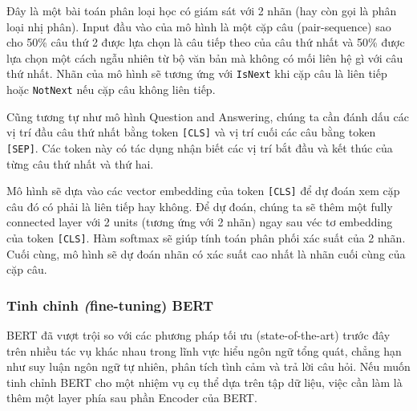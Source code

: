 \begin{enumerate}
    Đây là một bài toán phân loại học có giám sát với 2 nhãn (hay còn gọi là phân loại nhị phân). Input đầu vào của mô hình là một cặp câu (pair-sequence) sao cho 50\% câu thứ 2 được lựa chọn là câu tiếp theo của câu thứ nhất và 50\% được lựa chọn một cách ngẫu nhiên từ bộ văn bản mà không có mối liên hệ gì với câu thứ nhất. Nhãn của mô hình sẽ tương ứng với {\tt {\small IsNext}} khi cặp câu là liên tiếp hoặc {\tt {\small NotNext}} nếu cặp câu không liên tiếp.

    Cũng tương tự như mô hình Question and Answering, chúng ta cần đánh dấu các vị trí đầu câu thứ nhất bằng token {\tt [CLS]} và vị trí cuối các câu bằng token {\tt [SEP]}. Các token này có tác dụng nhận biết các vị trí bắt đầu và kết thúc của từng câu thứ nhất và thứ hai.

    Mô hình sẽ dựa vào các vector embedding của token {\tt [CLS]} để dự đoán xem cặp câu đó có phải là liên tiếp hay không. Để dự đoán, chúng ta sẽ thêm một fully connected layer với 2 units (tương ứng với 2 nhãn) ngay sau véc tơ embedding của token {\tt [CLS]}. Hàm softmax sẽ giúp tính toán phân phối xác suất của 2 nhãn. Cuối cùng, mô hình sẽ dự đoán nhãn có xác suất cao nhất là nhãn cuối cùng của cặp câu.
\end{enumerate}

\subsubsection{Tinh chỉnh \textit(fine-tuning) BERT}

BERT đã vượt trội so với các phương pháp tối ưu (state-of-the-art) trước đây trên nhiều tác vụ khác nhau trong lĩnh vực hiểu ngôn ngữ tổng quát, chẳng hạn như suy luận ngôn ngữ tự nhiên, phân tích tình cảm và trả lời câu hỏi.
Nếu muốn tinh chỉnh BERT cho một nhiệm vụ cụ thể dựa trên tập dữ liệu, việc cần làm là thêm một layer phía sau phần Encoder của BERT.

